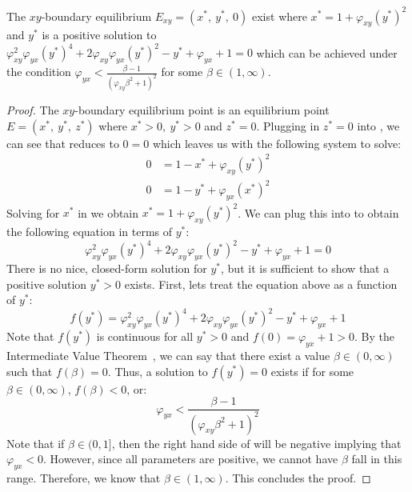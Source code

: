 \begin{theorem}\label{thm:boundary-xy-exist}
    The $xy$-boundary equilibrium $E_{xy}=\left(x^*,\ y^*,\ 0\right)$ exist where $x^*=1+\varphi_{xy}\left(y^*\right)^2$ and $y^*$ is a positive solution to \\
    $\varphi_{xy}^2\varphi_{yx}\left(y^*\right)^4+2\varphi_{xy}\varphi_{yx}\left(y^*\right)^2-y^*+\varphi_{yx}+1=0$ which can be achieved under the condition $\varphi_{yx}<\frac{\beta-1}{\left(\varphi_{xy}\beta^2+1\right)^2}$ for some $\beta\in\left(1, \infty\right)$.
\end{theorem}
\begin{proof}
    The $xy$-boundary equilibrium point is an equilibrium point $E=\left(x^*,\ y^*,\ z^*\right)$ where $x^*>0,\ y^*>0$ and $z^*=0$. Plugging in $z^*=0$ into , we can see that  reduces to $0=0$ which leaves us with the following system to solve:
    \begin{subequations}\label{system:xy-boundary}
        \begin{align}
            0 &= 1-x^*+\varphi_{xy}\left(y^*\right)^2 \label{eq:xy-boundary-x}\\
            0 &= 1-y^*+\varphi_{yx}\left(x^*\right)^2 \label{eq:xy-boundary-y}
        \end{align}
    \end{subequations}
    Solving for $x^*$ in  we obtain $x^*=1+\varphi_{xy}\left(y^*\right)^2$. We can plug this into  to obtain the following equation in terms of $y^*$:
    \begin{equation*}
        \varphi_{xy}^2\varphi_{yx}\left(y^*\right)^4+2\varphi_{xy}\varphi_{yx}\left(y^*\right)^2-y^*+\varphi_{yx}+1=0
    \end{equation*}
    There is no nice, closed-form solution for $y^*$, but it is sufficient to show that a positive solution $y^*>0$ exists. First, lets treat the equation above as a function of $y^*$:
    \begin{equation*}
        f\left(y^*\right)=\varphi_{xy}^2\varphi_{yx}\left(y^*\right)^4+2\varphi_{xy}\varphi_{yx}\left(y^*\right)^2-y^*+\varphi_{yx}+1
    \end{equation*}
    Note that $f\left(y^*\right)$ is continuous for all $y^*>0$ and $f(0)=\varphi_{yx}+1>0$. By the Intermediate Value Theorem~\cite{STEWART9781337613927}, we can say that there exist a value $\beta\in\left(0,\infty\right)$ such that $f(\beta)=0$. Thus, a solution to $f\left(y^*\right)=0$ exists if for some $\beta\in\left(0,\infty\right)$, $f\left(\beta\right)<0$, or:
    \begin{equation}\label{eq:xy-eq-condition}
        \varphi_{yx}<\frac{\beta-1}{\left(\varphi_{xy}\beta^2+1\right)^2}
    \end{equation}
    Note that if $\beta\in(0, 1]$, then the right hand side of  will be negative implying that $\varphi_{yx}<0$. However, since all parameters are positive, we cannot have $\beta$ fall in this range. Therefore, we know that $\beta\in\left(1,\infty\right)$. This concludes the proof.
\end{proof}


